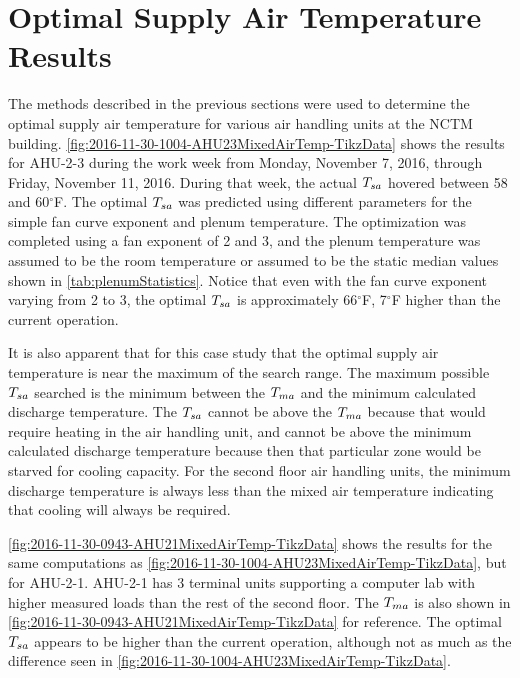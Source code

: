 \section{Optimal Supply Air Temperature Results}\label{sec:OptimalSupplyAirTemperatureResults}

The methods described in the previous sections were used to determine
the optimal supply air temperature for various air handling units at the
NCTM building.  \figref{}
\ref{fig:2016-11-30-1004-AHU23MixedAirTemp-TikzData} shows the results
for AHU-2-3 during the work week from Monday, November 7, 2016, through
Friday, November 11, 2016.  During that week, the actual \(T_{sa}\) hovered
between 58 and 60\(^\circ\)F. The optimal \(T_{sa}\) was predicted using
different parameters for the simple fan curve exponent and plenum
temperature.  The optimization was completed using a fan exponent of 2
and 3, and the plenum temperature was assumed to be the room temperature
or assumed to be the static median values shown in \tableref{}
\ref{tab:plenumStatistics}.  Notice that even with the fan curve
exponent varying from 2 to 3, the optimal \(T_{sa}\) is approximately
66\(^\circ\)F, 7\(^\circ\)F higher than the current operation. 

It is also apparent that for this case study that the optimal supply air
temperature is near the maximum of the search range.  The maximum
possible \(T_{sa}\) searched is the minimum between the \(T_{ma}\) and the
minimum calculated discharge temperature. The \(T_{sa}\) cannot be above
the \(T_{ma}\) because that would require heating in the air handling
unit, and cannot be above the minimum calculated discharge temperature
because then that particular zone would be starved for cooling capacity.
For the second floor air handling units, the minimum discharge
temperature is always less than the mixed air temperature indicating
that cooling will always be required.  

\figref{} \ref{fig:2016-11-30-0943-AHU21MixedAirTemp-TikzData} shows the
results for the same computations as \figref{}
\ref{fig:2016-11-30-1004-AHU23MixedAirTemp-TikzData}, but for AHU-2-1.
AHU-2-1 has 3 terminal units supporting a computer lab with higher
measured loads than the rest of the second floor.  The \(T_{ma}\) is also
shown in \figref{} \ref{fig:2016-11-30-0943-AHU21MixedAirTemp-TikzData}
for reference. The optimal \(T_{sa}\) appears to be higher than the
current operation, although not as much as the difference seen in
\figref{} \ref{fig:2016-11-30-1004-AHU23MixedAirTemp-TikzData}.


